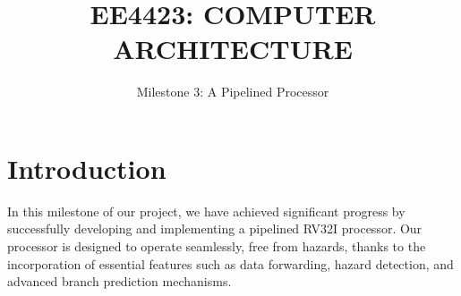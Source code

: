 \documentclass[12pt,a4paper,oneside]{book} %
\title{EE4423: COMPUTER ARCHITECTURE}
\subtitle{Milestone 3: A Pipelined Processor}
\begin{document}

\coverpage

\frontmatter

\pagestyle{fancy}

\tableofcontents
\listoffigures


\mainmatter


\chapter{Introduction}


In this milestone of our project, we have achieved significant progress by successfully developing and implementing a pipelined RV32I processor. Our processor is designed to operate seamlessly, free from hazards, thanks to the incorporation of essential features such as data forwarding, hazard detection, and advanced branch prediction mechanisms.
\end{document}
